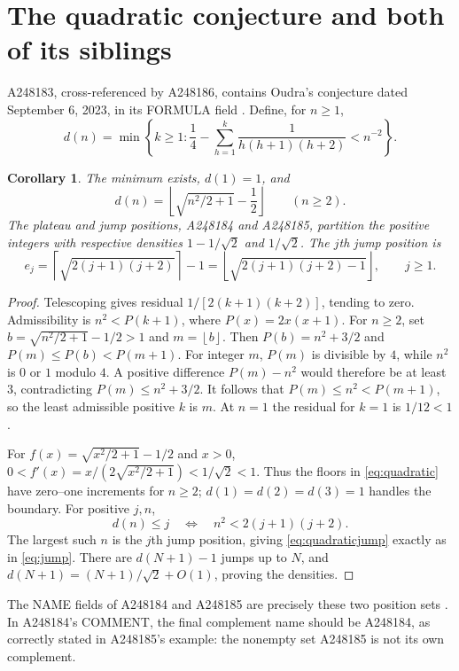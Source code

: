 \documentclass[11pt]{article}
\newtheorem{corollary}[theorem]{Corollary}
\newcommand{\floor}[1]{\left\lfloor #1\right\rfloor}
\newcommand{\ceil}[1]{\left\lceil #1\right\rceil}
\begin{document}
\section{The quadratic conjecture and both of its siblings}
A248183, cross-referenced by A248186, contains Oudra's conjecture
dated September 6, 2023, in its FORMULA field \cite{quadratic}.
Define, for $n\geq1$,
\[
 d(n)=\min\left\{k\geq1:\frac14-
 \sum_{h=1}^k\frac1{h(h+1)(h+2)}<n^{-2}\right\}.
\]
\begin{corollary}\label{cor:quadratic}
The minimum exists, $d(1)=1$, and
\begin{equation}\label{eq:quadratic}
 d(n)=\floor{\sqrt{n^2/2+1}-\frac12}\qquad(n\geq2).
\end{equation}
The plateau and jump positions, A248184 and A248185, partition the
positive integers with respective densities $1-1/\sqrt2$ and
$1/\sqrt2$. The $j$th jump position is
\begin{equation}\label{eq:quadraticjump}
 e_j=\ceil{\sqrt{2(j+1)(j+2)}}-1
     =\floor{\sqrt{2(j+1)(j+2)-1}},\qquad j\geq1.
\end{equation}
\end{corollary}
\begin{proof}
Telescoping gives residual $1/[2(k+1)(k+2)]$, tending to zero.
Admissibility is $n^2<P(k+1)$, where $P(x)=2x(x+1)$.
For $n\geq2$, set $b=\sqrt{n^2/2+1}-1/2>1$ and $m=\floor b$.
Then $P(b)=n^2+3/2$ and $P(m)\leq P(b)<P(m+1)$.
For integer $m$, $P(m)$ is divisible by $4$, while $n^2$ is
$0$ or $1$ modulo $4$. A positive difference $P(m)-n^2$ would
therefore be at least $3$, contradicting $P(m)\leq n^2+3/2$.
It follows that $P(m)\leq n^2<P(m+1)$, so the least admissible
positive $k$ is $m$. At $n=1$ the residual for $k=1$ is $1/12<1$.

For $f(x)=\sqrt{x^2/2+1}-1/2$ and $x>0$,
$0<f'(x)=x/(2\sqrt{x^2/2+1})<1/\sqrt2<1$.
Thus the floors in \eqref{eq:quadratic} have zero--one increments
for $n\geq2$; $d(1)=d(2)=d(3)=1$ handles the boundary.
For positive $j,n$,
\[
 d(n)\leq j\quad\Longleftrightarrow\quad n^2<2(j+1)(j+2).
\]
The largest such $n$ is the $j$th jump position, giving
\eqref{eq:quadraticjump} exactly as in \eqref{eq:jump}.
There are $d(N+1)-1$ jumps up to $N$, and
$d(N+1)=(N+1)/\sqrt2+O(1)$, proving the densities.
\end{proof}

The NAME fields of A248184 and A248185 are precisely these two
position sets \cite{quadraticpositions}. In A248184's COMMENT,
the final complement name should be A248184, as correctly stated in
A248185's example: the nonempty set A248185 is not its own complement.
\end{document}
